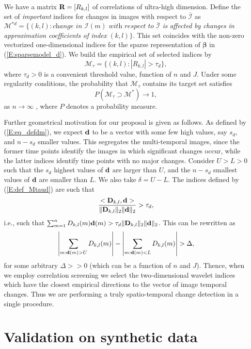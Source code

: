 \documentclass[journal]{IEEEtran}
\newcommand{\vbeta}{\pmb{\beta}}
\newcommand{\vD}{{\textbf D}}
\newcommand{\vd}{{\textbf d}}
\newcommand{\vR}{{\textbf R}}
\begin{document}
We have a matrix $\vR=[R_{k,l}]$ of correlations of ultra-high dimension. Define the set of 
{\it important} indices for changes in images with respect to $\bar{\mathcal I}$ as 
$\mathcal{M}^{*d}=\{(k,l): \textit{change in } \mathcal{I}(m)\textit{ with respect to}$ $\bar{\mathcal{I}}$ \textit{is affected by changes in approximation coefficients of index} $(k,l)\}$.  This set coincides with the non-zero vectorized one-dimensional indices for the sparse representation of $\vbeta$ in (\ref{E:sparsemodel_d}). 
We build the empirical set of selected indices by
\begin{equation}
\mathcal{M}_{\tau}=\{(k,l):|R_{k,l}|>\tau_d\},
\label{E:def_Mtaud}
\end{equation}
where $\tau_d>0$ is a convenient threshold value, function of $n$ and $J$. Under some regularity conditions, the probability that $\mathcal{M}_{\tau}$ contains its target set satisfies
\[
P(\mathcal{M}_{\tau}\supset\mathcal{M}^{*})\rightarrow 1,
\]
as $n\rightarrow\infty$ \cite{fan2020statistical}, where $P$ denotes a probability measure.

Further geometrical motivation for our proposal is given as follows. As defined by (\ref{E:eq_defdm}), we expect $\vd$ to be a vector with some few high values, say $s_d$, and $n-s_d$ smaller values. This segregates the multi-temporal images, since the former time points identify the images in which significant changes occur, while the latter indices identify time points with no major changes. Consider $U>L>0$ such that the $s_d$ highest values of $\vd$ are larger than $U$, and the $n-s_d$ smallest values of $\vd$ are smaller than $L$. We also take $\delta=U-L$. The indices defined by  (\ref{E:def_Mtaud}) are such that   
\[
\frac{<\vD_{k,l},\vd>}{\|\vD_{k,l}\|_2\|\vd\|_2}>\tau_d,
\]
i.e., such that  $\sum_{m=1}^nD_{k,l}(m)\vd(m)>\tau_d\|\vD_{k,l}\|_2\|\vd\|_2$. This can be rewritten as
\[
\left|\sum_{m:\vd(m)>U} D_{k,l}(m)\right|-\left|\sum_{m:\vd(m)<L} D_{k,l}(m)\right|>\Delta,
\]
for some arbitrary $\Delta>>0$ (which can be a function of $n$ and $J$). Thence, when we employ correlation screening we select the two-dimensional wavelet indices which have the closest empirical directions to the vector of image temporal changes. Thus we are performing a truly spatio-temporal change detection in a single procedure.




\section{Validation on synthetic data}\label{section_validation}
\end{document}
